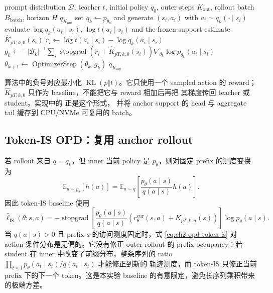 \documentclass[lang=cn,scheme=chinese,openany]{../book/elegantbook}
\newcommand{\sg}{\operatorname{stopgrad}}
\begin{document}
\begin{algorithm}[ht]
\caption{On-policy OPD baseline\\{\small\textit{Semantics: 每个 outer step 用当前 student 重新 rollout；无 mirror 正则}}}
\begin{algorithmic}[1]
\Require prompt distribution $\mathcal D$, teacher $t$, initial policy $q_0$, outer steps $K_{\mathrm{out}}$, rollout batch $B_{\mathrm{batch}}$, horizon $H$
\Ensure $q_{K_{\mathrm{out}}}$
    \State set $q_k\gets p_{\theta_k}$ and generate $(s_i,a_i)$ with $a_i\sim q_k(\cdot\mid s_i)$
    \State evaluate $\log q_k(a_i\mid s_i)$, $\log t(a_i\mid s_i)$ and the frozen-support estimate $\widehat K_{pT,k,0}(s_i)$
    \State $r_i\gets\log t(a_i\mid s_i)-\log q_k(a_i\mid s_i)$
    \State $g_k\gets-|\mathcal B_k|^{-1}\sum_i\sg(r_i+\widehat K_{pT,k,0}(s_i))\nabla_{\theta_k}\log p_{\theta_k}(a_i\mid s_i)$
    \State $\theta_{k+1}\gets\operatorname{OptimizerStep}(\theta_k,g_k)$
\EndFor
\State \Return $q_{K_{\mathrm{out}}}$
\end{algorithmic}
\end{algorithm}

算法中的负号对应最小化 $\operatorname{KL}(p\Vert t)$。它只使用一个 sampled action 的 reward；$\widehat K_{pT,k,0}$ 只作为 baseline，不能把它与 reward 相加后再把 其梯度传回 teacher 或 student。实现中的  正是这个形式， 并将 anchor support 的 head 与 aggregate tail 缓存到 CPU/NVMe 可复用的 batch。

\subsection{Token-IS OPD：复用 anchor rollout}
\label{subsec:ch2-opd-is-baseline}

若 rollout 来自 $q=q_k$，但 inner 当前 policy 是 $p_\theta$，则对固定 prefix 的测度变换为
\begin{equation}
\label{eq:ch2-opd-token-is}
\mathbb E_{a\sim p_\theta}[h(a)]
 =\mathbb E_{a\sim q}
 \left[\frac{p_\theta(a\mid s)}{q(a\mid s)}h(a)\right].
\end{equation}
因此 token-IS baseline 使用
\begin{equation}
\widehat\ell_{\mathrm{IS}}(\theta;s,a)
 =-\sg\!\left[
 \frac{p_\theta(a\mid s)}{q(a\mid s)}
 \left(r_\theta^{\mathrm{cur}}(s,a)+K_{pT,k,n}(s)\right)\right]
 \log p_\theta(a\mid s).
\end{equation}
当 $q(a\mid s)>0$ 且 prefix $s$ 的访问测度固定时，式 \eqref{eq:ch2-opd-token-is} 对 action 条件分布是无偏的。它没有修正 outer rollout 的 prefix occupancy：若 student 在 inner 中改变了前缀分布，整条序列的 ratio $\prod_{t\leq l}p_\theta(a_t\mid s_t)/q(a_t\mid s_t)$ 才能修正到新的 轨迹测度，而 token-IS 只修正当前 prefix 下的下一个 token。这是本实验 baseline 的有意限定，避免长序列乘积带来的极端方差。
\end{document}
